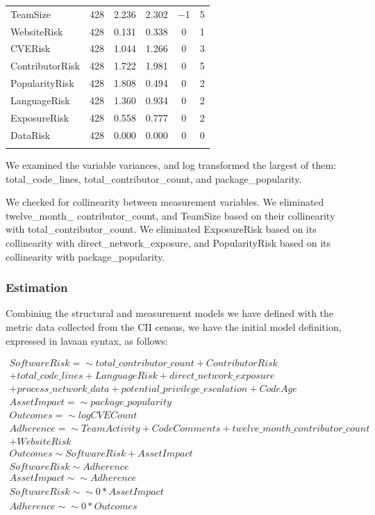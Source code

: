 \begin{table}[!htbp]
\begin{small}
\begin{tabular}{@{\extracolsep{5pt}}lccccc}
		TeamSize & 428 & 2.236 & 2.302 & $-$1 & 5 \\ 
		WebsiteRisk & 428 & 0.131 & 0.338 & 0 & 1 \\ 
		CVERisk & 428 & 1.044 & 1.266 & 0 & 3 \\ 
		ContributorRisk & 428 & 1.722 & 1.981 & 0 & 5 \\ 
		PopularityRisk & 428 & 1.808 & 0.494 & 0 & 2 \\ 
		LanguageRisk & 428 & 1.360 & 0.934 & 0 & 2 \\ 
		ExposureRisk & 428 & 0.558 & 0.777 & 0 & 2 \\ 
		DataRisk & 428 & 0.000 & 0.000 & 0 & 0 \\ 
		\hline \\[-1.8ex] 
	\end{tabular} 
	\end{small}
\end{table}

We examined the variable variances, and log transformed the largest of them: total\_code\_lines, total\_contributor\_count, and package\_popularity.

We checked for collinearity between measurement variables. We eliminated twelve\_month\_ contributor\_count, and TeamSize based on their collinearity with total\_contributor\_count. We eliminated ExposureRisk based on its collinearity with direct\_network\_exposure, and PopularityRisk based on its collinearity with package\_popularity.

\subsubsection{Estimation}
Combining the structural and measurement models we have defined with the metric data collected from the CII census, we have the initial model definition, expressed in lavaan syntax, as follows:

\begin{align*}
SoftwareRisk =\sim  total\_contributor\_count + ContributorRisk \\ + total\_code\_lines 
+ LanguageRisk + direct\_network\_exposure\\
 + process\_network\_data 
+ potential\_privilege\_escalation + CodeAge \\
AssetImpact =\sim package\_popularity \\
Outcomes =\sim  logCVECount \\
Adherence =\sim  TeamActivity + CodeComments + 
	twelve\_month\_contributor\_count\\  + WebsiteRisk  \\
Outcomes \sim SoftwareRisk + AssetImpact \\
SoftwareRisk \sim  Adherence \\
AssetImpact \sim\sim  Adherence\\
SoftwareRisk \sim\sim 0*AssetImpact\\
Adherence \sim\sim 0*Outcomes\\
\end{align*}

